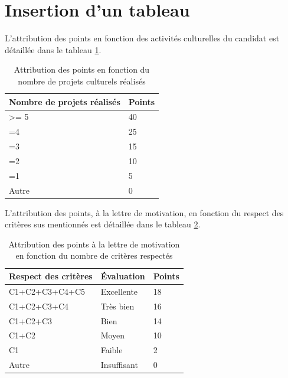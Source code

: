 \section{Insertion d'un tableau}

L'attribution des points en fonction des activités culturelles du candidat est détaillée dans le tableau \ref{tab3}. 

\begin{table}
\begin{center}
\caption{Attribution des points en fonction du nombre de projets culturels réalisés}
\label{tab3}
\begin{tabular}{|l|l|}
\hline
\rowcolor[gray]{0.8}\bfseries Nombre de projets réalisés & \bfseries Points\\
\hline
>= 5 &40\\
\hline
=4 & 25\\
\hline
=3 & 15\\
\hline
=2 &10\\
\hline
=1 & 5\\
\hline
Autre & 0\\
\hline
\end{tabular}
\end{center}

\end{table}





L'attribution des points, à la lettre de motivation, en fonction du respect des critères sus mentionnés est détaillée dans le tableau \ref{tab5}.

\begin{table}
\begin{center}
\caption{Attribution des points à la lettre de motivation en fonction du nombre de critères respectés}
\label{tab5}
\begin{tabular}{|l|l|l|}
\hline
\rowcolor[gray]{0.8}\bfseries Respect des critères &\bfseries Évaluation &\bfseries Points \\
\hline
C1+C2+C3+C4+C5 & Excellente &18\\
\hline
C1+C2+C3+C4 & Très bien & 16\\
\hline
C1+C2+C3 & Bien & 14\\
\hline
C1+C2 & Moyen &10\\
\hline
C1 & Faible & 2\\
\hline
Autre & Insuffisant & 0\\
\hline
\end{tabular}
\end{center}

\end{table}



